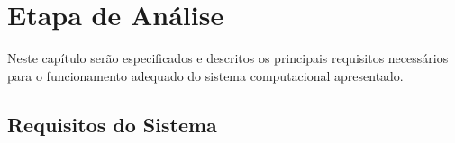 
\chapter{Etapa de An\'{a}lise}

Neste capítulo serão especificados e descritos os principais requisitos necessários para o funcionamento adequado do sistema computacional apresentado.



\section{Requisitos do Sistema}

